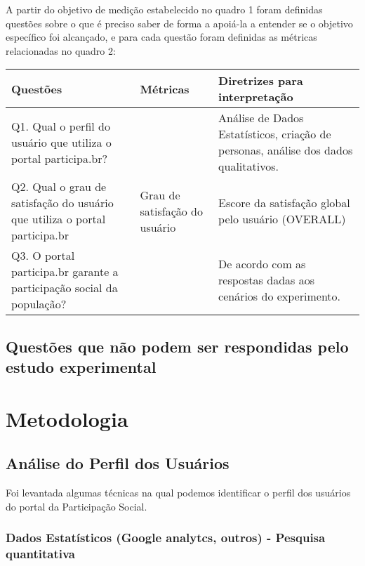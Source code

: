 A partir do objetivo de medição estabelecido no quadro 1  foram definidas questões sobre o que é preciso saber de forma a apoiá-la a entender se o objetivo específico foi alcançado, e para cada questão foram definidas as métricas relacionadas no quadro 2: 

\begin{table}[h]
\begin{tabular}{|l|l|l|}
\hline
\textbf{Questões}                                                          & Métricas                      & Diretrizes para interpretação                                                       \\ \hline
Q1. Qual o perfil do usuário que utiliza o portal participa.br?            &                               & Análise de Dados Estatísticos, criação de personas, análise dos dados qualitativos. \\ \hline
Q2. Qual o grau de satisfação do usuário que utiliza o portal participa.br & Grau de satisfação do usuário & Escore da satisfação global pelo usuário (OVERALL)                                  \\ \hline
Q3. O portal participa.br garante a participação social da população?      &                               & De acordo com as respostas dadas aos cenários do experimento.                       \\ \hline
\end{tabular}
\end{table}


\subsection{Questões que não podem ser respondidas pelo estudo experimental}

\section{Metodologia}

\subsection{Análise do Perfil dos Usuários}

	Foi levantada algumas técnicas na qual podemos identificar o perfil dos usuários do portal da Participação Social.

\subsubsection{Dados Estatísticos (Google analytcs, outros) - Pesquisa quantitativa}

